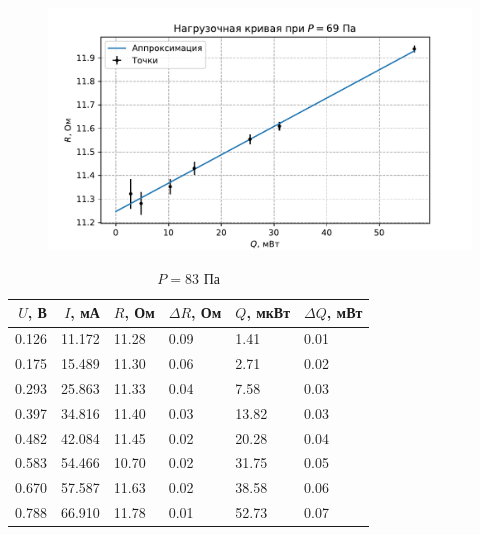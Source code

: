 \begin{figure}[H]\centering\includegraphics[width=\textwidth]{graphs/RQ69.45.pdf}\end{figure}\begin{table}[H]
\centering
\caption{$P = 83$ Па}
\begin{tabular}{rrllll}
\hline
 $U$, В &  $I$, мА &     $R$, Ом & $\Delta R$, Ом &     $Q$, мкВт & $\Delta Q$, мВт \\ \hline
0.126 & 11.172 & 11.28 &           0.09 &  1.41 &            0.01 \\ \hline
0.175 & 15.489 & 11.30 &           0.06 &  2.71 &            0.02 \\ \hline
0.293 & 25.863 & 11.33 &           0.04 &  7.58 &            0.03 \\ \hline
0.397 & 34.816 & 11.40 &           0.03 & 13.82 &            0.03 \\ \hline
0.482 & 42.084 & 11.45 &           0.02 & 20.28 &            0.04 \\ \hline
0.583 & 54.466 & 10.70 &           0.02 & 31.75 &            0.05 \\ \hline
0.670 & 57.587 & 11.63 &           0.02 & 38.58 &            0.06 \\ \hline
0.788 & 66.910 & 11.78 &           0.01 & 52.73 &            0.07 \\ \hline
\end{tabular}
\end{table}
